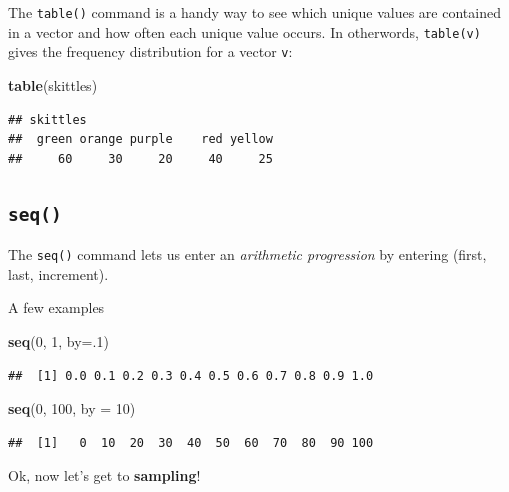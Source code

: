 \documentclass[
]{book}
\newenvironment{Shaded}{\begin{snugshade}}{\end{snugshade}}
\newcommand{\AttributeTok}[1]{\textcolor[rgb]{0.13,0.29,0.53}{#1}}
\newcommand{\DecValTok}[1]{\textcolor[rgb]{0.00,0.00,0.81}{#1}}
\newcommand{\FunctionTok}[1]{\textcolor[rgb]{0.13,0.29,0.53}{\textbf{#1}}}
\newcommand{\NormalTok}[1]{#1}
\theoremstyle{definition}
\theoremstyle{definition}
\theoremstyle{definition}
\theoremstyle{definition}
\theoremstyle{remark}
\begin{document}
The \texttt{table()} command is a handy way to see which unique values are contained in a vector and how often each unique value occurs. In otherwords, \texttt{table(v)} gives the frequency distribution for a vector \texttt{v}:

\begin{Shaded}
\begin{Highlighting}[]
\FunctionTok{table}\NormalTok{(skittles)}
\end{Highlighting}
\end{Shaded}

\begin{verbatim}
## skittles
##  green orange purple    red yellow 
##     60     30     20     40     25
\end{verbatim}

\subsection*{\texorpdfstring{\texttt{seq()}}{seq()}}\label{seq}

The \texttt{seq()} command lets us enter an \emph{arithmetic progression} by entering (first, last, increment).

A few examples

\begin{Shaded}
\begin{Highlighting}[]
\FunctionTok{seq}\NormalTok{(}\DecValTok{0}\NormalTok{, }\DecValTok{1}\NormalTok{, }\AttributeTok{by=}\NormalTok{.}\DecValTok{1}\NormalTok{)}
\end{Highlighting}
\end{Shaded}

\begin{verbatim}
##  [1] 0.0 0.1 0.2 0.3 0.4 0.5 0.6 0.7 0.8 0.9 1.0
\end{verbatim}

\begin{Shaded}
\begin{Highlighting}[]
\FunctionTok{seq}\NormalTok{(}\DecValTok{0}\NormalTok{, }\DecValTok{100}\NormalTok{, }\AttributeTok{by =} \DecValTok{10}\NormalTok{)}
\end{Highlighting}
\end{Shaded}

\begin{verbatim}
##  [1]   0  10  20  30  40  50  60  70  80  90 100
\end{verbatim}

Ok, now let's get to \textbf{sampling}!
\end{document}
